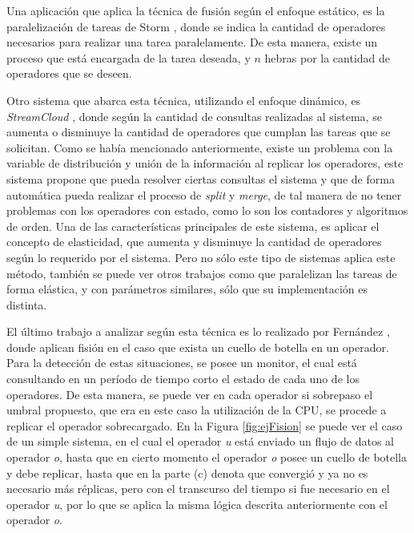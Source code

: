 Una aplicación que aplica la técnica de fusión según el enfoque estático, es la paralelización de tareas de Storm \citep{stormtwitterdoc}, donde se indica la cantidad de operadores necesarios para realizar una tarea paralelamente. De esta manera, existe un proceso que está encargada de la tarea deseada, y $n$ hebras por la cantidad de operadores que se deseen.

Otro sistema que abarca esta técnica, utilizando el enfoque dinámico, es \textit{StreamCloud} \citep{GulisanoJPSV12}, donde según la cantidad de consultas realizadas al sistema, se aumenta o disminuye la cantidad de operadores que cumplan las tareas que se solicitan. Como se había mencionado anteriormente, existe un problema con la variable de distribución y unión de la información al replicar los operadores, este sistema propone que pueda resolver ciertas consultas el sistema y que de forma automática pueda realizar el proceso de \textit{split} y \textit{merge}, de tal manera de no tener problemas con los operadores con estado, como lo son los contadores y algoritmos de orden. Una de las características principales de este sistema, es aplicar el concepto de elasticidad, que aumenta y disminuye la cantidad de operadores según lo requerido por el sistema. Pero no sólo este tipo de sistemas aplica este método, también se puede ver otros trabajos como \citep{GedikSHW14, SchneiderAGBW09} que paralelizan las tareas de forma elástica, y con parámetros similares, sólo que su implementación es distinta.

El último trabajo a analizar según esta técnica es lo realizado por Fernández \citep{FernandezMKP13}, donde aplican fisión en el caso que exista un cuello de botella en un operador. Para la detección de estas situaciones, se posee un monitor, el cual está consultando en un período de tiempo corto el estado de cada uno de los operadores. De esta manera, se puede ver en cada operador si sobrepaso el umbral propuesto, que era en este caso la utilización de la CPU, se procede a replicar el operador sobrecargado. En la Figura \ref{fig:ejFision} se puede ver el caso de un simple sistema, en el cual el operador \textit{u} está enviado un flujo de datos al operador \textit{o}, hasta que en cierto momento el operador \textit{o} posee un cuello de botella y debe replicar, hasta que en la parte (c) denota que convergió y ya no es necesario más réplicas, pero con el transcurso del tiempo si fue necesario en el operador \textit{u}, por lo que se aplica la misma lógica descrita anteriormente con el operador \textit{o}.

